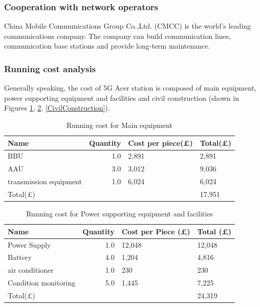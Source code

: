 \documentclass[11pt]{article}
\numberwithin{equation}{section}
\begin{document}
\subsubsection{Cooperation with network operators}
\label{sec:orgd8d9683}
China Mobile Communications Group Co.,Ltd. (CMCC) is the world's leading communications company. The company can build communication lines, communication base stations and provide long-term maintenance.

\subsubsection{Running cost analysis}
\label{sec:orgd09dd87}
Generally speaking, the cost of 5G Acer station is composed of main equipment, power supporting equipment and facilities and civil construction (shown in Figures \ref{MainEquipment}, \ref{PowerSupportingEquipmentAndFacilities}, \ref{CivilConstruction}).

\begin{table}[H]
\caption{\label{MainEquipment}Running cost for Main equipment}
\centering
\begin{tabular}{lrll}
\toprule
Name & Quantity & Cost per piece(\pounds) & Total(\pounds)\\
\midrule
BBU & 1.0 & 2,891 & 2,891\\
AAU & 3.0 & 3,012 & 9,036\\
transmission equipment & 1.0 & 6,024 & 6,024\\
\midrule
Total(\pounds) &  &  & 17,951\\
\bottomrule
\end{tabular}
\end{table}

\begin{table}[H]
\caption{\label{PowerSupportingEquipmentAndFacilities}Running cost for Power supporting equipment and facilities}
\centering
\begin{tabular}{lrll}
\toprule
Name & Quantity & Cost per Piece (\pounds) & Total (\pounds)\\
\midrule
Power Supply & 1.0 & 12,048 & 12,048\\
Battery & 4.0 & 1,204 & 4,816\\
air conditioner & 1.0 & 230 & 230\\
Condition monitoring & 5.0 & 1,445 & 7,225\\
\midrule
Total(\pounds) &  &  & 24,319\\
\bottomrule
\end{tabular}
\end{table}
\end{document}
